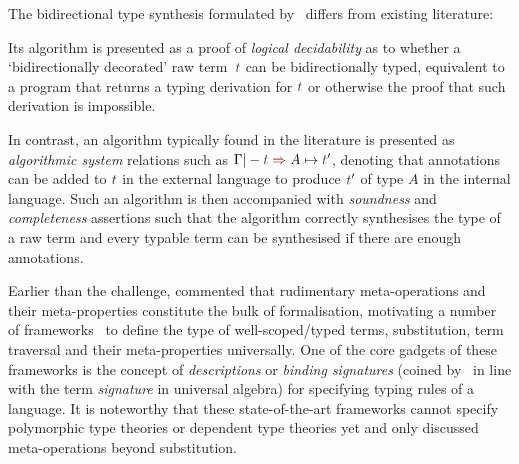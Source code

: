 \begin{remark}\label{re:type-synthesis-as-decidability-proof}
The bidirectional type synthesis formulated by~\citeauthor{Wadler2022} differs from existing literature:
\begin{enumerate*}
  \item Its algorithm is presented as a proof of \emph{logical decidability} as to whether a `bidirectionally decorated' raw term~$\isTerm{t}$ can be bidirectionally typed, equivalent to a program that returns a typing derivation for $\isTerm{t}$ or otherwise the proof that such derivation is impossible.
  \item In contrast, an algorithm typically found in the literature is presented as \emph{algorithmic system} relations such as $\Gamma |- \isTerm{t} \syn A \mapsto \isTerm{t}'$, denoting that annotations can be added to $\isTerm{t}$ in the external language to produce $\isTerm{t}'$ of type $A$ in the internal language.
    Such an algorithm is then accompanied with \emph{soundness} and \emph{completeness} assertions such that the algorithm correctly synthesises the type of a raw term and every typable term can be synthesised if there are enough annotations.
\end{enumerate*}
\end{remark}

Earlier than the \PoplMark challenge, \citet{Altenkirch1993} commented that rudimentary meta-operations and their meta-properties constitute the bulk of formalisation, motivating a number of frameworks~\citep{Ahrens2018,Fiore2022,Gheri2020,Ahrens2022,Allais2021} to define the type of well-scoped/typed terms, substitution, term traversal and their meta-properties universally.
One of the core gadgets of these frameworks is the concept of \emph{descriptions} or \emph{binding signatures} (coined by~\citet{Aczel1978} in line with the term \emph{signature} in universal algebra) for specifying typing rules of a language.
It is noteworthy that these state-of-the-art frameworks cannot specify polymorphic type theories or dependent type theories yet and only \citeauthor{Allais2021} discussed meta-operations beyond substitution.


